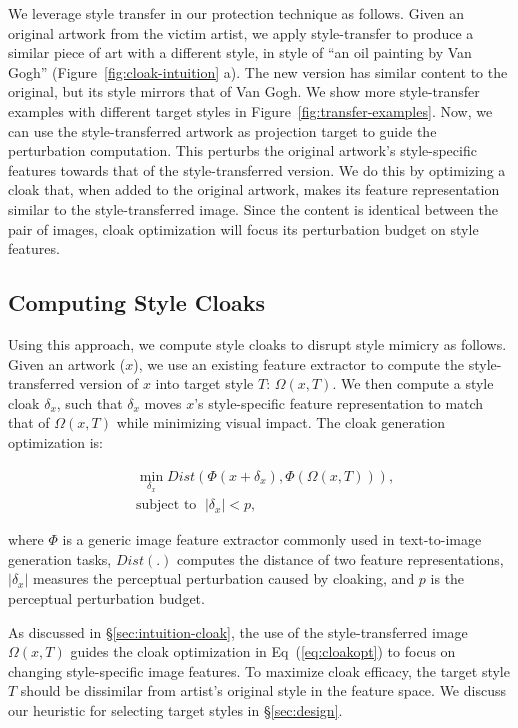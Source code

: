 We leverage style transfer in our protection technique as follows. Given an
original artwork from the victim artist, we apply style-transfer to produce a
similar piece of art with a different style, \eg in style of ``an oil
painting by Van Gogh'' (Figure~\ref{fig:cloak-intuition} a). The new
version has similar content to the original, but its style mirrors that
of Van Gogh. We show more style-transfer examples with different target styles in
Figure~\ref{fig:transfer-examples}. Now, we can use the style-transferred
artwork as projection target to guide the perturbation computation. This
perturbs the original artwork's style-specific features towards that of
the style-transferred version. We do this by optimizing a cloak that, when
added to the original artwork, makes its feature representation similar to
the style-transferred image. Since the content is identical between the pair
of images, cloak optimization will focus its perturbation budget on style
features. 

\secspace
\subsection{Computing Style Cloaks} 

Using this approach, we compute style cloaks to disrupt style mimicry as
follows. Given an artwork ($x$), we use an existing feature extractor to
compute the style-transferred version of $x$ into target style $T$: $\Omega(x, T)$.
We then compute a style cloak $\delta_x$, such that $\delta_x$ moves $x$'s
style-specific feature representation to match that of $\Omega(x, T)$ while
minimizing visual impact. The cloak generation optimization is:

\secspace
\begin{eqnarray}
   &\min\limits_{\delta_x} Dist\left( \Phi(x + \delta_x), \Phi (\Omega(x, T))\right),  \label{eq:cloakopt}\\
  & \text{subject to } \; |\delta_x|< p, \nonumber
\end{eqnarray} 

\noindent where $\Phi$ is a generic image feature extractor commonly used in
text-to-image generation tasks, $Dist(.)$ computes the distance of two
feature representations, $|\delta_x|$ measures the perceptual perturbation
caused by cloaking, and $p$ is the perceptual perturbation budget. 

As discussed in \S\ref{sec:intuition-cloak}, the use of the style-transferred
image $\Omega(x, T)$ guides the cloak optimization in Eq~(\ref{eq:cloakopt})
to focus on changing style-specific image features. To maximize cloak
efficacy, the target style $T$ should be dissimilar from artist's original
style in the feature space. We discuss our heuristic for selecting target styles in
\S\ref{sec:design}.

